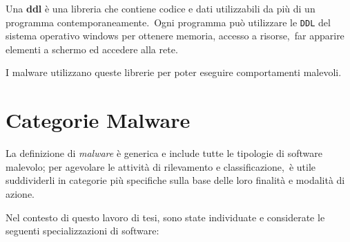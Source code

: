 Una \textbf{ddl} è una libreria che contiene codice e dati utilizzabili da più di un programma contemporaneamente.\
Ogni programma può utilizzare le \texttt{DDL} del sistema operativo windows per ottenere memoria, accesso a risorse,\
far apparire elementi a schermo ed accedere alla rete\cite{Microsoft-DLL}.

I malware utilizzano queste librerie per poter eseguire comportamenti malevoli.

\section{Categorie Malware}

La definizione di \textit{malware} è generica e include tutte le tipologie di software malevolo; per agevolare le attività di rilevamento e classificazione,\
è utile suddividerli in categorie più specifiche sulla base delle loro finalità e modalità di azione.

Nel contesto di questo lavoro di tesi, sono state individuate e considerate le seguenti specializzazioni di software:

